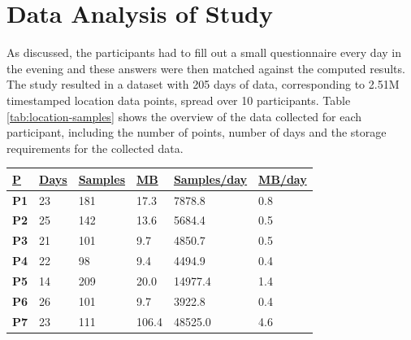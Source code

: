 \section{Data Analysis of Study}
As discussed, the participants had to fill out a small questionnaire every day in the evening and these answers were then matched against the computed results. The study resulted in a dataset with 205 days of data, corresponding to 2.51M timestamped location data points, spread over 10 participants. Table \ref{tab:location-samples} shows the overview of the data collected for each participant, including the number of points, number of days and the storage requirements for the collected data.
\begin{table}[]
    \centering
        \begin{tabular}{|l|l|l|l|l|l|}
        \hline
        {\ul \textbf{P}} & {\ul \textbf{Days}} & {\ul \textbf{Samples}} & {\ul \textbf{MB}} & {\ul \textbf{Samples/day}} & {\ul \textbf{MB/day}} \\ \hline
        \textbf{P1}                & 23                   & 181                        & 17.3                           & 7878.8                              & 0.8                              \\ \hline
        \textbf{P2}                & 25                   & 142                        & 13.6                           & 5684.4                              & 0.5                             \\ \hline
        \textbf{P3}                & 21                   & 101                        & 9.7                            & 4850.7                              & 0.5                             \\ \hline
        \textbf{P4}                & 22                   & 98                         & 9.4                            & 4494.9                              & 0.4                             \\ \hline
        \textbf{P5}                & 14                   & 209                        & 20.0                           & 14977.4                             & 1.4                             \\ \hline
        \textbf{P6}                & 26                   & 101                        & 9.7                            & 3922.8                              & 0.4                             \\ \hline
        \textbf{P7}                & 23                   & 111                       & 106.4                          & 48525.0                             & 4.6                             \\ \hline

\end{tabular}
\end{table}

